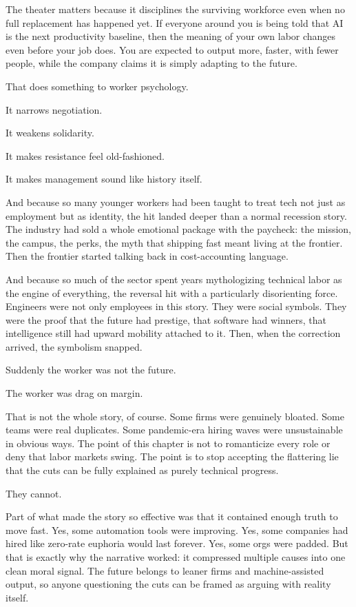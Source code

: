 \documentclass[
  american,
  12pt,
  letterpaper,
]{article}
\begin{document}
The theater matters because it disciplines the surviving workforce even
when no full replacement has happened yet. If everyone around you is
being told that AI is the next productivity baseline, then the meaning
of your own labor changes even before your job does. You are expected to
output more, faster, with fewer people, while the company claims it is
simply adapting to the future.

That does something to worker psychology.

It narrows negotiation.

It weakens solidarity.

It makes resistance feel old-fashioned.

It makes management sound like history itself.

And because so many younger workers had been taught to treat tech not
just as employment but as identity, the hit landed deeper than a normal
recession story. The industry had sold a whole emotional package with
the paycheck: the mission, the campus, the perks, the myth that shipping
fast meant living at the frontier. Then the frontier started talking
back in cost-accounting language.

And because so much of the sector spent years mythologizing technical
labor as the engine of everything, the reversal hit with a particularly
disorienting force. Engineers were not only employees in this story.
They were social symbols. They were the proof that the future had
prestige, that software had winners, that intelligence still had upward
mobility attached to it. Then, when the correction arrived, the
symbolism snapped.

Suddenly the worker was not the future.

The worker was drag on margin.

That is not the whole story, of course. Some firms were genuinely
bloated. Some teams were real duplicates. Some pandemic-era hiring waves
were unsustainable in obvious ways. The point of this chapter is not to
romanticize every role or deny that labor markets swing. The point is to
stop accepting the flattering lie that the cuts can be fully explained
as purely technical progress.

They cannot.

Part of what made the story so effective was that it contained enough
truth to move fast. Yes, some automation tools were improving. Yes, some
companies had hired like zero-rate euphoria would last forever. Yes,
some orgs were padded. But that is exactly why the narrative worked: it
compressed multiple causes into one clean moral signal. The future
belongs to leaner firms and machine-assisted output, so anyone
questioning the cuts can be framed as arguing with reality itself.
\end{document}
